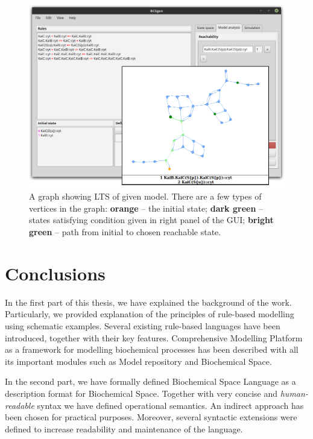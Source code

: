 \documentclass[12pt, twoside]{fithesis2} %
\begin{document}
\begin{figure}[!h]
\begin{center}
\includegraphics[scale=0.35]{pics/BCSgen_reach}
\caption{A graph showing LTS of given model. There are a few types of vertices in the graph: \textbf{orange} -- the initial state; \textbf{dark green} -- states satisfying condition given in right panel of the GUI; \textbf{bright green} -- path from initial to chosen reachable state.}\label{gui_reach}
\end{center}
\end{figure}

\chapter{Conclusions}

In the first part of this thesis, we have explained the background of the work. Particularly, we provided explanation of the principles of rule-based modelling using schematic examples. Several existing rule-based languages have been introduced, together with their key features. Comprehensive Modelling Platform as a framework for modelling biochemical processes has been described with all its important modules such as Model repository and Biochemical Space.

In the second part, we have formally defined Biochemical Space Language as a description format for Biochemical Space. Together with very concise and \emph{human-readable} syntax we have defined operational semantics. An indirect approach has been chosen for practical purposes. Moreover, several syntactic extensions were defined to increase readability and maintenance of the language.
\end{document}
